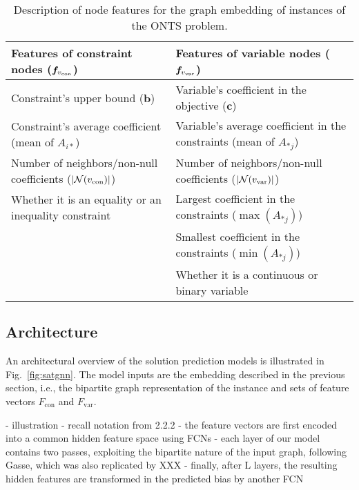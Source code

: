 \begin{table}[h]
    \centering
    \begin{tabular}{p{7cm}|p{7cm}}
    \toprule
        Features of constraint nodes ($\bm{f}_{v_{\rm con}}$) & Features of variable nodes ($\bm{f}_{v_{\rm var}}$) \\
    \midrule
	Constraint's upper bound ($\bm{b}$)                     &  Variable's coefficient in the objective ($\bm{c}$)\\[0.8cm]
         Constraint's average coefficient (mean of $A_{i*}$)     &  Variable's average coefficient in the constraints (mean of $A_{*j}$) \\[0.8cm]
         Number of neighbors/non-null coefficients ($|\mathcal{N}(v_{\rm con})|$)    &  Number of neighbors/non-null coefficients ($|\mathcal{N}(v_{\rm var})|$) \\[0.8cm]
         Whether it is an equality or an inequality constraint &  Largest coefficient in the constraints ($\max(A_{*j})$) \\[0.8cm]
                                                                    &  Smallest coefficient in the constraints ($\min(A_{*j})$) \\[0.8cm]
                                                                    &  Whether it is a continuous or binary variable \\
    \bottomrule
    \end{tabular}
    \caption{Description of node features for the graph embedding of instances of the ONTS problem.}
    \label{tab:feature-desc}
\end{table}

\subsection{Architecture}

An architectural overview of the solution prediction models is illustrated in Fig.~\ref{fig:satgnn}.
The model inputs are the embedding described in the previous section, i.e., the bipartite graph representation of the instance and sets of feature vectors $F_\textrm{con}$ and $F_\textrm{var}$.

- illustration
- recall notation from 2.2.2
- the feature vectors are first encoded into a common hidden feature space using FCNs
- each layer of our model contains two passes, exploiting the bipartite nature of the input graph, following Gasse, which was also replicated by XXX
- finally, after L layers, the resulting hidden features are transformed in the predicted bias by another FCN

